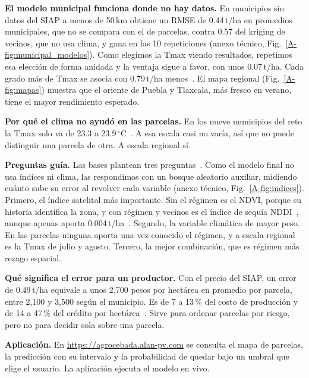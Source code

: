 \textbf{El modelo municipal funciona donde no hay datos.} En municipios sin datos del SIAP a menos de 50\,km obtiene un
RMSE de 0.44\,t/ha en promedios municipales, que no se compara con el de parcelas, contra 0.57 del kriging de vecinos,
que no usa clima, y gana en las 10 repeticiones (anexo técnico, Fig.~\ref{A-fig:municipal_modelos}). Como elegimos la
Tmax viendo resultados, repetimos esa elección de forma anidada y la ventaja sigue a favor, con unos 0.07\,t/ha. Cada
grado más de Tmax se asocia con 0.79\,t/ha menos~\cite{doc_generalizable}. El mapa
regional (Fig.~\ref{A-fig:mapas}) muestra que el oriente de Puebla y Tlaxcala, más fresco en verano, tiene el mayor
rendimiento esperado.

\textbf{Por qué el clima no ayudó en las parcelas.} En los nueve municipios del reto la Tmax solo va de 23.3 a
23.9\,$^\circ$C~\cite{doc_generalizable}. A esa escala casi no varía, así que no puede distinguir una parcela de otra.
A escala regional sí.

\textbf{Preguntas guía.} Las bases plantean tres preguntas~\cite{bases}. Como el modelo final no usa índices ni
clima, las respondimos con un bosque aleatorio auxiliar, midiendo cuánto sube su error al revolver cada variable
(anexo técnico, Fig.~\ref{A-fig:indices}). Primero, el índice satelital más importante. Sin el régimen es el NDVI,
porque su historia identifica la zona, y con régimen y vecinos es el índice de sequía NDDI~\cite{gu2007}, aunque apenas
aporta 0.004\,t/ha~\cite{doc_modelo}. Segundo, la variable climática de mayor peso. En las parcelas ninguna aporta una
vez conocido el régimen, y a escala regional es la Tmax de julio y agosto. Tercero, la mejor combinación, que es
régimen más rezago espacial.

\textbf{Qué significa el error para un productor.} Con el precio del SIAP, un error de 0.49\,t/ha equivale a unos
2,700 pesos por hectárea en promedio por parcela, entre 2,100 y 3,500 según el municipio. Es de 7 a 13\,\% del costo de
producción y de 14 a 47\,\% del crédito por hectárea~\cite{repo}. Sirve para ordenar parcelas por riesgo, pero no para
decidir sola sobre una parcela.

\textbf{Aplicación.} En \url{https://agrocebada.alan-pv.com} se consulta el mapa de parcelas, la predicción con su
intervalo y la probabilidad de quedar bajo un umbral que elige el usuario. La aplicación ejecuta el modelo en vivo.

